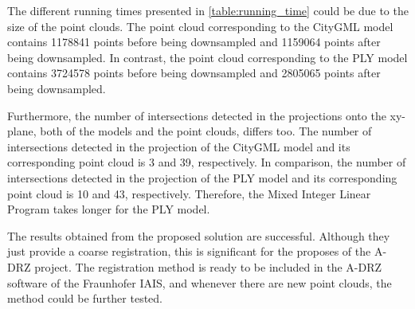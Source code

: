         The different running times presented in \autoref{table:running_time} could be due to the size of the point clouds. 
        The point cloud corresponding to the CityGML model contains 1178841 points before being downsampled and 1159064 points after being downsampled.
        In contrast, the point cloud corresponding to the PLY model contains 3724578 points before being downsampled and 2805065 points after being downsampled.

        Furthermore, the number of intersections detected in the projections onto the xy-plane, both of the models and the point clouds, differs too.
        The number of intersections detected in the projection of the CityGML model and its corresponding point cloud is 3 and 39, respectively. 
        In comparison, the number of intersections detected in the projection of the PLY model and its corresponding point cloud is 10 and 43, respectively.
        Therefore, the Mixed Integer Linear Program takes longer for the PLY model.
        
        The results obtained from the proposed solution are successful. 
        Although they just provide a coarse registration, this is significant for the proposes of the A-DRZ project.
        The registration method is ready to be included in the A-DRZ software of the Fraunhofer IAIS,
        and whenever there are new point clouds, the method could be further tested.




        

    

